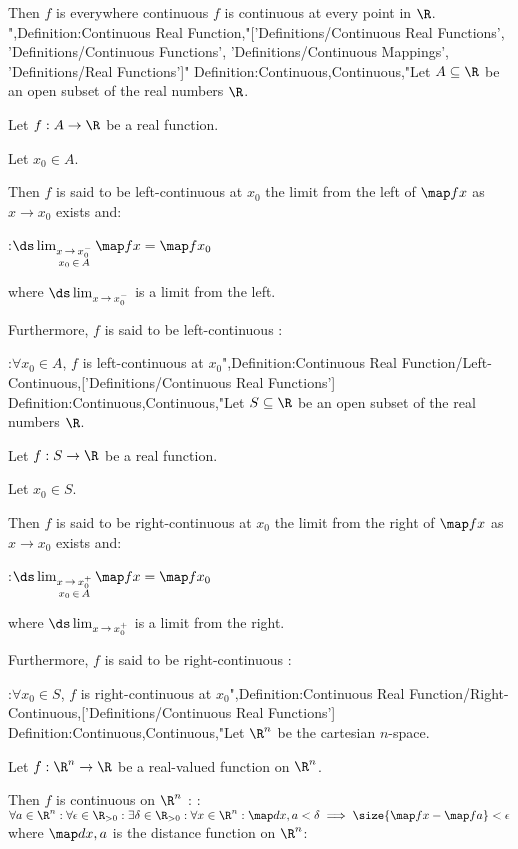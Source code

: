 Then $f$ is everywhere continuous  $f$ is continuous at every point in $\R$.
",Definition:Continuous Real Function,"['Definitions/Continuous Real Functions', 'Definitions/Continuous Functions', 'Definitions/Continuous Mappings', 'Definitions/Real Functions']"
Definition:Continuous,Continuous,"Let $A \subseteq \R$ be an open subset of the real numbers $\R$.

Let $f: A \to \R$ be a real function.


Let $x_0 \in A$. 

Then $f$ is said to be left-continuous at $x_0$  the limit from the left of $\map f x$ as $x \to x_0$ exists and:

:$\ds \lim_{\substack {x \mathop \to x_0^- \\ x_0 \mathop \in A} } \map f x = \map f {x_0}$

where $\ds \lim_{x \mathop \to x_0^-}$ is a limit from the left.


Furthermore, $f$ is said to be left-continuous :

:$\forall x_0 \in A$, $f$ is left-continuous at $x_0$",Definition:Continuous Real Function/Left-Continuous,['Definitions/Continuous Real Functions']
Definition:Continuous,Continuous,"Let $S \subseteq \R$ be an open subset of the real numbers $\R$.

Let $f: S \to \R$ be a real function.


Let $x_0 \in S$. 

Then $f$ is said to be right-continuous at $x_0$  the limit from the right of $\map f x$ as $x \to x_0$ exists and:

:$\ds \lim_{\substack {x \mathop \to x_0^+ \\ x_0 \mathop \in A}} \map f x = \map f {x_0}$

where $\ds \lim_{x \mathop \to x_0^+}$ is a limit from the right.


Furthermore, $f$ is said to be right-continuous :

:$\forall x_0 \in S$, $f$ is right-continuous at $x_0$",Definition:Continuous Real Function/Right-Continuous,['Definitions/Continuous Real Functions']
Definition:Continuous,Continuous,"Let $\R^n$ be the cartesian $n$-space.

Let $f: \R^n \to \R$ be a real-valued function on $\R^n$.


Then $f$ is continuous on $\R^n$ :
:$\forall a \in \R^n: \forall \epsilon \in \R_{>0}: \exists \delta \in \R_{>0}: \forall x \in \R^n: \map d {x, a} < \delta \implies \size {\map f x - \map f a} < \epsilon$
where $\map d {x, a}$ is the distance function on $\R^n$:

